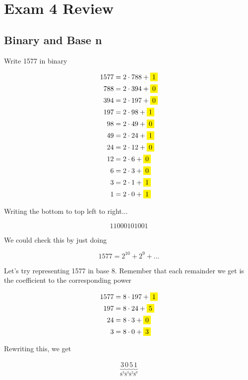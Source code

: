 \documentclass[../../Main.tex]{subfiles}
\begin{document}
\section{Exam 4 Review}

\subsection{Binary and Base n}

Write 1577 in binary

\begin{align*}
    1577 &= 2 \cdot 788 + \yellowbox{1} \\
    788 &= 2 \cdot 394 + \yellowbox{0} \\
    394 &= 2 \cdot 197 + \yellowbox{0} \\
    197 &= 2 \cdot 98 + \yellowbox{1} \\
    98 &= 2 \cdot 49 + \yellowbox{0} \\
    49 &= 2 \cdot 24 + \yellowbox{1} \\
    24 &= 2 \cdot 12 + \yellowbox{0} \\
    12 &= 2 \cdot 6 + \yellowbox{0} \\
    6 &= 2 \cdot 3 + \yellowbox{0} \\
    3 &= 2 \cdot 1 + \yellowbox{1} \\
    1 &= 2 \cdot 0 + \yellowbox{1} \\
\end{align*}

Writing the bottom to top left to right...

$$\boxed{11000101001}$$

We could check this by just doing 

$$1577 = 2^{10} + 2^9 + \ldots $$

Let's try representing 1577 in base 8. Remember that each remainder we get is the coefficient to the corresponding power

\begin{align*}
    1577 &= 8 \cdot 197 + \yellowbox{1} \\
    197 &= 8 \cdot 24 + \yellowbox{5} \\
    24 &= 8 \cdot 3 + \yellowbox{0} \\
    3 &= 8 \cdot 0 + \yellowbox{3} \\
\end{align*}

Rewriting this, we get

\begin{align*}
    \underbrace{3}_{8^3}
    \underbrace{0}_{8^3}
    \underbrace{5}_{8^2}
    \underbrace{1}_{8^0}
\end{align*}
\end{document}
